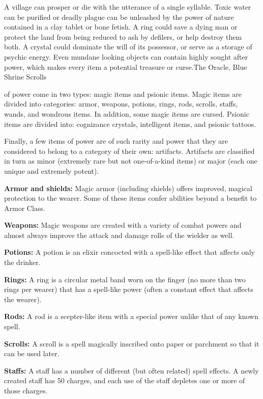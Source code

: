 {A village can prosper or die with the utterance of a single syllable. Toxic water can be purified or deadly plague can be unleashed by the power of nature contained in a clay tablet or bone fetish. A ring could save a dying man or protect the land from being reduced to ash by defilers, or help destroy them both. A crystal could dominate the will of its possessor, or serve as a storage of psychic energy. Even mundane looking objects can contain highly sought after power, which makes every item a potential treasure or curse.}{The Oracle, Blue Shrine Scrolls}

 of power come in two types: magic items and psionic items. Magic items are divided into categories: armor, weapons, potions, rings, rods, scrolls, staffs, wands, and wondrous items. In addition, some magic items are cursed. Psionic items are divided into: cognizance crystals, intelligent items, and psionic tattoos.

Finally, a few items of power are of such rarity and power that they are considered to belong to a category of their own: artifacts. Artifacts are classified in turn as minor (extremely rare but not one-of-a-kind items) or major (each one unique and extremely potent).

\textbf{Armor and shields:} Magic armor (including shields) offers improved, magical protection to the wearer. Some of these items confer abilities beyond a benefit to Armor Class.

\textbf{Weapons:} Magic weapons are created with a variety of combat powers and almost always improve the attack and damage rolls of the wielder as well.

\textbf{Potions:} A potion is an elixir concocted with a spell-like effect that affects only the drinker.

\textbf{Rings:} A ring is a circular metal band worn on the finger (no more than two rings per wearer) that has a spell-like power (often a constant effect that affects the wearer).

\textbf{Rods:} A rod is a scepter-like item with a special power unlike that of any known spell.

\textbf{Scrolls:} A scroll is a spell magically inscribed onto paper or parchment so that it can be used later.

\textbf{Staffs:} A staff has a number of different (but often related) spell effects. A newly created staff has 50 charges, and each use of the staff depletes one or more of those charges.

